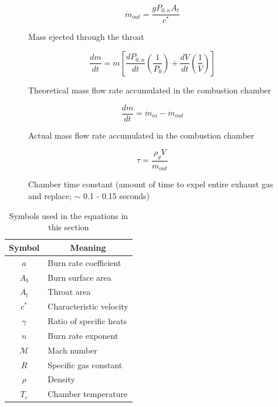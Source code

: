 \begin{figure}[htbp]
    \begin{equation} \label{equation:7}
        \dot{m}_{out} = \frac{g P_{0,n} A_t}{c^*}
    \end{equation}
    \caption*{Mass ejected through the throat}
\end{figure}

\begin{figure}[htbp]
    \begin{equation} \label{equation:8}
        \frac{dm}{dt} = m \left[\frac{dP_{0,n}}{dt} \left(\frac{1}{P_0}\right) + \frac{dV}{dt} \left(\frac{1}{V}\right)\right]
    \end{equation}
    \caption*{Theoretical mass flow rate accumulated in the combustion chamber}
\end{figure}

\begin{figure}[htbp]
    \begin{equation} \label{equation:9}
        \frac{dm}{dt} = \dot{m}_{in} - \dot{m}_{out}
    \end{equation}
    \caption*{Actual mass flow rate accumulated in the combustion chamber}
\end{figure}

\begin{figure}[htbp]
    \begin{equation} \label{equation:10}
        \tau = \frac{\rho_g V}{\dot{m}_{out}}
    \end{equation}
    \caption*{Chamber time constant (amount of time to expel entire exhaust gas and replace; \(\sim\) 0.1 - 0.15 seconds)}
\end{figure}

\begin{table}
    \centering
    \begin{tabular}{c|l}
        \textbf{Symbol} & \multicolumn{1}{c}{\textbf{Meaning}} \\ \hline
        \(a\) & Burn rate coefficient \\ 
        \(A_b\) & Burn surface area \\
        \(A_t\) & Throat area \\
        \(c^*\) & Characteristic velocity \\
        \(\gamma\) & Ratio of specific heats \\
        \(n\) & Burn rate exponent \\
        \(\mathcal{M}\) & Mach number \\
        \(R\) & Specific gas constant \\
        \(\rho\) & Density \\
        \(T_c\) & Chamber temperature
    \end{tabular}
    \caption{Symbols used in the equations in this section}
    \label{table:prop-symbol-table}
\end{table}

